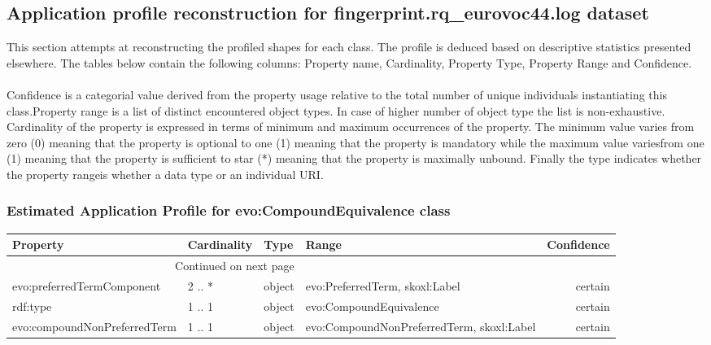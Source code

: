 \documentclass[10pt,a4paper,titlepage,final]{article}
\begin{document}
\subsection{Application profile reconstruction for fingerprint.rq\_eurovoc44.log dataset}
This section attempts at reconstructing the profiled shapes for each class. The profile is deduced based on descriptive statistics presented elsewhere. The tables below contain the following columns: Property name, Cardinality, Property Type, Property Range and Confidence. \\\\ Confidence is a categorial value derived from the property usage relative to the total number of unique individuals instantiating this class.Property range is a list of distinct encountered object types. In case of higher number of object type the list is non{-}exhaustive. Cardinality of the property is expressed in terms of minimum and maximum occurrences of the property. The minimum value varies from zero (0) meaning that the property is optional to one (1) meaning that the property is mandatory while the maximum value variesfrom one (1) meaning that the property is sufficient to star (*) meaning that the property is maximally unbound. Finally the type indicates whether the property rangeis whether a data type or an individual URI.
\subsubsection{Estimated Application Profile for evo:CompoundEquivalence class}
\begin{tabularx}{\textwidth}{lllXr}
\toprule
                     Property & Cardinality &    Type &                                      Range & Confidence \\
\midrule
\endhead
\midrule
\multicolumn{3}{r}{{Continued on next page}} \\
\midrule
\endfoot

\bottomrule
\endlastfoot
   evo:preferredTermComponent &      2 .. * &  object &             evo:PreferredTerm, skoxl:Label &    certain \\
                     rdf:type &      1 .. 1 &  object &                    evo:CompoundEquivalence &    certain \\
 evo:compoundNonPreferredTerm &      1 .. 1 &  object &  evo:CompoundNonPreferredTerm, skoxl:Label &    certain \\
\end{tabularx}
\end{document}
